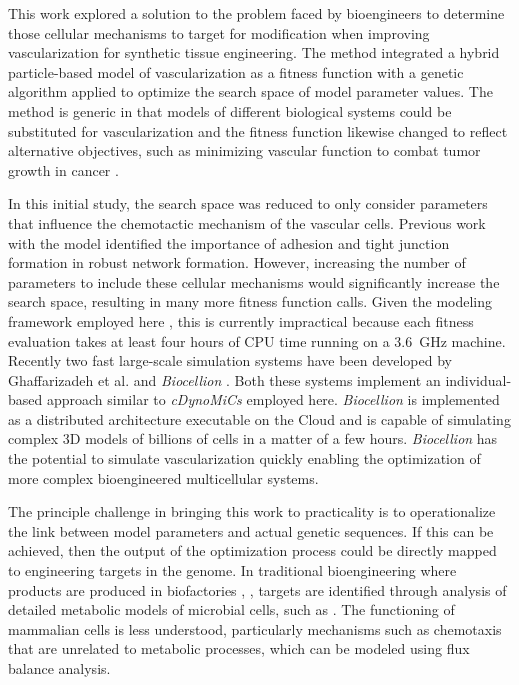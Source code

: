 This work explored a solution to the problem faced by bioengineers to determine those
cellular mechanisms to target for modification when improving vascularization for
synthetic tissue engineering. The method integrated a hybrid particle-based model of
vascularization as a fitness function with a genetic algorithm applied to optimize
the search space of model parameter values. The method is generic in that models of
different biological systems could be substituted for vascularization and the fitness
function likewise changed to reflect alternative objectives, such as minimizing
vascular function to combat tumor growth in cancer \cite{Mahoney2010MultiObjective}.

In this initial study, the search space was reduced to only consider parameters that
influence the chemotactic mechanism of the vascular cells. Previous work with the
model identified the importance of adhesion and tight junction formation in robust
network formation. However, increasing the number of parameters to include these
cellular mechanisms would significantly increase the search space, resulting in many
more fitness function calls. Given the modeling framework employed here
\cite{Lardon2011IDynoMiCS}, this is currently impractical because each fitness
evaluation takes at least four hours of CPU time running on a 3.6~GHz machine.
Recently two fast large-scale simulation systems have been developed by Ghaffarizadeh
et al. \cite{ghaffarizadeh2015agent} and \textsl{Biocellion}
\cite{delindavis:biocellion}. Both these systems implement an individual-based
approach similar to \textsl{cDynoMiCs} employed here. \textsl{Biocellion} is
implemented as a distributed architecture executable on the Cloud
\cite{Hashem2015Rise} and is capable of simulating complex 3D models of billions of
cells in a matter of a few hours. \textsl{Biocellion} has the potential to simulate
vascularization quickly enabling the optimization of more complex bioengineered
multicellular systems.

The principle challenge in bringing this work to practicality is to operationalize
the link between model parameters and actual genetic sequences. If this can be
achieved, then the output of the optimization process could be directly mapped to
engineering targets in the genome. In traditional bioengineering where products are
produced in biofactories \cite{delindavis:Sharma2001Production},
\cite{delindavis:vanDijl2013Bacillus}, targets are identified through analysis of
detailed metabolic models of microbial cells, such as \cite{Karp2015Pathway}. The
functioning of mammalian cells is less understood, particularly mechanisms such as
chemotaxis that are unrelated to metabolic processes, which can be modeled using flux
balance analysis.

